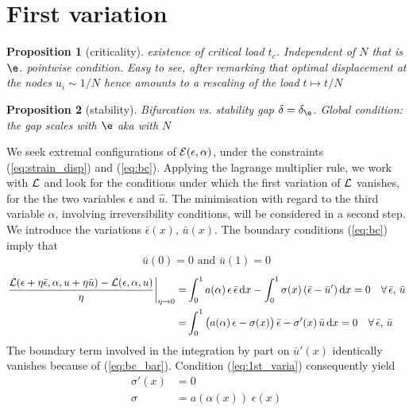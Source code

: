 \documentclass[]{article}
\newtheorem{prop}{Proposition}
\renewcommand*\d{\mathop{}\!\mathrm{d}} %
\begin{document}
\section{First variation} \label{sec:1st_varia}
%
%
%
\begin{prop}[criticality]
    existence of critical load $t_c$. Independent of $N$ that is $\e$.
    pointwise condition. Easy to see, after remarking that optimal displacement at the nodes $u_i\sim 1/N$ hence
    amounts to a rescaling of the load $t\mapsto t/N$
\end{prop}
\begin{prop}[stability]
    Bifurcation vs. stability gap $\delta=\delta_\e$.
    Global condition: the gap scales with $\e$ aka with $N$
\end{prop}
%
%
%
%
We seek extremal configurations of ${\cal E}(\epsilon,\alpha)$, under the constraints (\ref{eq:strain_disp}) and (\ref{eq:bc}).
Applying the lagrange multiplier rule, we work with ${\cal L}$ and look for the conditions under which the first variation of ${\cal L}$ vanishes, for the the two variables $\epsilon$ and $\hat{u}$.
The minimisation with regard to the third variable $\alpha$, involving irreversibility conditions, will be considered in a second step.
We introduce the variations $\bar{\epsilon}(x)$, $\bar{u}(x)$. The boundary conditions (\ref{eq:bc}) imply that
\begin{align}
\label{eq:bc_bar}
\bar{u}(0)=0 \text{ and } \bar{u}(1)=0
\end{align} 
%
\begin{subequations}
\label{sys:1st_varia}
\begin{align}
\left. \frac{{\cal L}(\epsilon+\eta\bar{\epsilon},\alpha,u+\eta \bar{u})-{\cal L}(\epsilon,\alpha,u)}{\eta} \right|_{\eta \to 0} = & 
\int_0^1 a(\alpha) \, \epsilon \, \bar{\epsilon} \d x -
\int_0^1 \sigma(x)  \,  (\bar{\epsilon}-\bar{u}') \d x = 0 \quad \forall \, \bar{\epsilon}, \, \bar{u}
\\
= & \int_0^1 \big( a(\alpha) \, \epsilon - \sigma(x) \big) \, \bar{\epsilon} - \sigma'(x) \, \bar{u} \d x
= 0 \quad \forall \, \bar{\epsilon}, \, \bar{u} \label{eq:1st_varia}
\end{align} 
\end{subequations}
The boundary term involved in the integration by part on $\bar{u}'(x)$ identically vanishes because of (\ref{eq:bc_bar}).
Condition (\ref{eq:1st_varia}) consequently yield
\begin{subequations}
\label{sys:equil_sol}
\begin{align}
\sigma'(x) & =  0 \\
\sigma & =  a(\alpha(x)) \; \epsilon(x) \label{eq:9b}
\end{align} 
\end{subequations}
\end{document}

